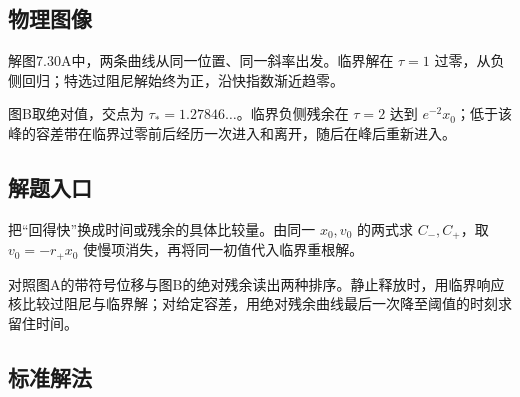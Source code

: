 \documentclass[UTF8,fontset=fandol,a4paper,11pt]{ctexart}
\begin{document}


\subsection*{物理图像}

解图7.30A中，两条曲线从同一位置、同一斜率出发。临界解在 $\tau=1$ 过零，从负侧回归；特选过阻尼解始终为正，沿快指数渐近趋零。

图B取绝对值，交点为 $\tau_*=1.27846\ldots$。临界负侧残余在 $\tau=2$ 达到 $e^{-2}x_0$；低于该峰的容差带在临界过零前后经历一次进入和离开，随后在峰后重新进入。




\subsection*{解题入口}

把“回得快”换成时间或残余的具体比较量。由同一 $x_0,v_0$ 的两式求 $C_-,C_+$，取 $v_0=-r_+x_0$ 使慢项消失，再将同一初值代入临界重根解。

对照图A的带符号位移与图B的绝对残余读出两种排序。静止释放时，用临界响应核比较过阻尼与临界解；对给定容差，用绝对残余曲线最后一次降至阈值的时刻求留住时间。



\subsection*{标准解法}
\end{document}
